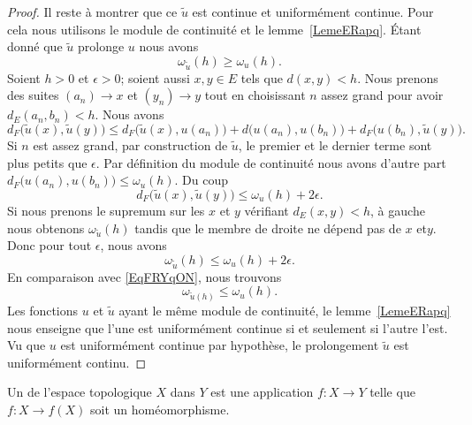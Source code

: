 \begin{proof}
	Il reste à montrer que ce \( \tilde u\) est continue et uniformément continue. Pour cela nous utilisons le module de continuité et le lemme~\ref{LemeERapq}. Étant donné que \( \tilde u\) prolonge \( u\) nous avons
	\begin{equation}        \label{EqFRYqON}
		\omega_{\tilde u}(h)\geq \omega_u(h).
	\end{equation}
	Soient \( h>0\) et \( \epsilon>0\); soient aussi \( x,y\in E\) tels que \( d(x,y)<h\). Nous prenons des suites \( (a_n)\to x\) et \( (y_n)\to y\) tout en choisissant \( n\) assez grand pour avoir \( d_E(a_n,b_n)<h\). Nous avons
	\begin{equation}
		d_F\big( \tilde u(x),\tilde u(y) \big)\leq d_F\big( \tilde u(x),u(a_n) \big)+d\big( u(a_n),u(b_n) \big)+d_F\big( u(b_n),\tilde u(y) \big).
	\end{equation}
	Si \( n\) est assez grand, par construction de \( \tilde u\), le premier et le dernier terme sont plus petits que \( \epsilon\). Par définition du module de continuité nous avons d'autre part \( d_F\big( u(a_n),u(b_n) \big)\leq \omega_u(h)\). Du coup
	\begin{equation}
		d_F\big( \tilde u(x),\tilde u(y) \big)\leq \omega_u(h)+2\epsilon.
	\end{equation}
	Si nous prenons le supremum sur les \( x\) et \( y\) vérifiant \( d_E(x,y)<h\), à gauche nous obtenons \( \omega_{\tilde u}(h)\) tandis que le membre de droite ne dépend pas de \( x\) et\( y\). Donc pour tout \( \epsilon\), nous avons
	\begin{equation}
		\omega_{\tilde u}(h)\leq \omega_u(h)+2\epsilon.
	\end{equation}
	En comparaison avec \eqref{EqFRYqON}, nous trouvons
	\begin{equation}
		\omega_{\tilde u(h)}\leq \omega_u(h).
	\end{equation}
	Les fonctions \( u\) et \( \tilde u\) ayant le même module de continuité, le lemme~\ref{LemeERapq} nous enseigne que l'une est uniformément continue si et seulement si l'autre l'est. Vu que \( u\) est uniformément continue par hypothèse, le prolongement \( \tilde u\) est uniformément continu.
\end{proof}

\begin{definition}
	Un  de l'espace topologique \( X\) dans \( Y\) est une application \( f\colon X\to Y\) telle que \( f\colon X\to f(X)\) soit un homéomorphisme.
\end{definition}

